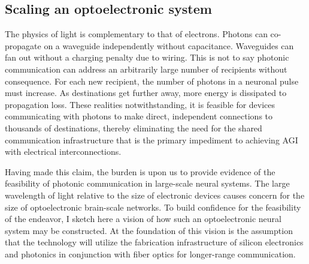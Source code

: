 \documentclass{article}
\begin{document}
\begin{multicols}{2}
\section{\label{sec:communication}Scaling an optoelectronic system}
The physics of light is complementary to that of electrons. Photons can co-propagate on a waveguide independently without capacitance. Waveguides can fan out without a charging penalty due to wiring. This is not to say photonic communication can address an arbitrarily large number of recipients without consequence. For each new recipient, the number of photons in a neuronal pulse must increase. As destinations get further away, more energy is dissipated to propagation loss. These realities notwithstanding, it is feasible for devices communicating with photons to make direct, independent connections to thousands of destinations, thereby eliminating the need for the shared communication infrastructure that is the primary impediment to achieving AGI with electrical interconnections.

Having made this claim, the burden is upon us to provide evidence of the feasibility of photonic communication in large-scale neural systems. The large wavelength of light relative to the size of electronic devices causes concern for the size of optoelectronic brain-scale networks. To build confidence for the feasibility of the endeavor, I sketch here a vision of how such an optoelectronic neural system may be constructed. At the foundation of this vision is the assumption that the technology will utilize the fabrication infrastructure of silicon electronics and photonics in conjunction with fiber optics for longer-range communication. 


\end{multicols}
\end{document}
